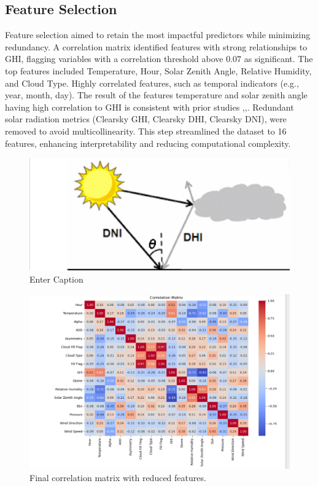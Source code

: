 \documentclass[10pt,twocolumn]{article}
\begin{document}
\begin{itemize}
\subsection{Feature Selection}
Feature selection aimed to retain the most impactful predictors while minimizing redundancy. A correlation matrix identified features with strong relationships to GHI, flagging variables with a correlation threshold above 0.07 as significant. The top features included Temperature, Hour, Solar Zenith Angle, Relative Humidity, and Cloud Type. Highly correlated features, such as temporal indicators (e.g., year, month, day). The result of the features temperature and solar zenith angle having high correlation to GHI is consistent with prior studies \cite{5},\cite{14},\cite{18}. Redundant solar radiation metrics (Clearsky GHI, Clearsky DHI, Clearsky DNI), were removed to avoid multicollinearity. This step streamlined the dataset to 16 features, enhancing interpretability and reducing computational complexity.
\begin{figure}
    \centering
    \includegraphics[width=0.5\linewidth]{GHI.png}
    \caption{Enter Caption}
\end{figure}
\begin{figure}
    \centering
    \includegraphics[width=1\linewidth]{fincorr.png}
    \caption{Final correlation matrix with reduced features.}
    \label{Figure 1}
\end{figure}


\end{itemize}
\end{document}
